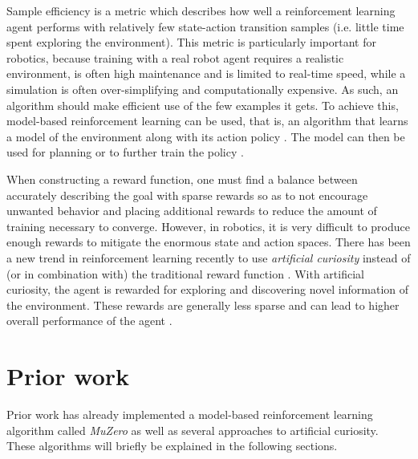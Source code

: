 \documentclass{article}
\begin{document}
Sample efficiency is a metric which describes how well a reinforcement learning agent performs with relatively few state-action transition samples (i.e. little time spent exploring the environment). This metric is particularly important for robotics, because training with a real robot agent requires a realistic environment, is often high maintenance and is limited to real-time speed, while a simulation is often over-simplifying and computationally expensive. As such, an algorithm should make efficient use of the few examples it gets. To achieve this, model-based reinforcement learning can be used, that is, an algorithm that learns a model of the environment along with its action policy \cite{muzero}. The model can then be used for planning or to further train the policy \cite{muzero}.

When constructing a reward function, one must find a balance between accurately describing the goal with sparse rewards so as to not encourage unwanted behavior and placing additional rewards to reduce the amount of training necessary to converge. However, in robotics, it is very difficult to produce enough rewards to mitigate the enormous state and action spaces. There has been a new trend in reinforcement learning recently to use \textit{artificial curiosity} instead of (or in combination with) the traditional reward function \cite{curious}. With artificial curiosity, the agent is rewarded for exploring and discovering novel information of the environment. These rewards are generally less sparse and can lead to higher overall performance of the agent \cite{curious}.

\section{Prior work}
Prior work has already implemented a model-based reinforcement learning algorithm called \textit{MuZero} as well as several approaches to artificial curiosity. These algorithms will briefly be explained in the following sections.
\end{document}
